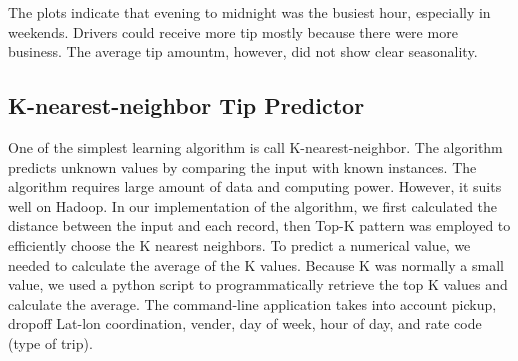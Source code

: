 \documentclass[12pt,a4paper]{article}
\begin{document}
\begin{figure}[h!]
  \end{figure}

  The plots indicate that evening to midnight was the busiest hour, especially in weekends. Drivers could receive more tip mostly because there were more business. The average tip amountm, however, did not show clear seasonality. 

  \subsection{K-nearest-neighbor Tip Predictor}
  One of the simplest learning algorithm is call K-nearest-neighbor. The algorithm predicts unknown values by comparing the input with known instances. The algorithm requires large amount of data and computing power. However, it suits well on Hadoop. In our implementation of the algorithm, we first calculated the distance between the input and each record, then Top-K pattern was employed to efficiently choose the K nearest neighbors. To predict a numerical value, we needed to calculate the average of the K values. Because K was normally a small value, we used a python script to programmatically retrieve the top K values and calculate the average. The command-line application takes into account pickup, dropoff Lat-lon coordination, vender, day of week, hour of day, and rate code (type of trip).
\end{document}
